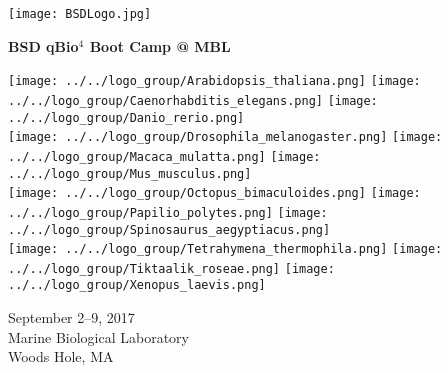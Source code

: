\documentclass{article}
\begin{document}
\begin{centering}
\texttt{[image: BSDLogo.jpg]}

\vspace{0.11in}

\Huge{\textbf{BSD qBio$^4$ Boot Camp @ MBL}}

\vspace{0.4in}

\texttt{[image: ../../logo\_group/Arabidopsis\_thaliana.png]}
\texttt{[image: ../../logo\_group/Caenorhabditis\_elegans.png]}
\texttt{[image: ../../logo\_group/Danio\_rerio.png]}\\
\texttt{[image: ../../logo\_group/Drosophila\_melanogaster.png]}
\texttt{[image: ../../logo\_group/Macaca\_mulatta.png]}
\texttt{[image: ../../logo\_group/Mus\_musculus.png]}\\
\texttt{[image: ../../logo\_group/Octopus\_bimaculoides.png]}
\texttt{[image: ../../logo\_group/Papilio\_polytes.png]}
\texttt{[image: ../../logo\_group/Spinosaurus\_aegyptiacus.png]}\\
\texttt{[image: ../../logo\_group/Tetrahymena\_thermophila.png]}
\texttt{[image: ../../logo\_group/Tiktaalik\_roseae.png]}
\texttt{[image: ../../logo\_group/Xenopus\_laevis.png]}

\vspace{0.4in}

\Large{September 2--9, 2017}\\
\Large{Marine Biological Laboratory}\\
\Large{Woods Hole, MA}

\end{centering}
\end{document}
